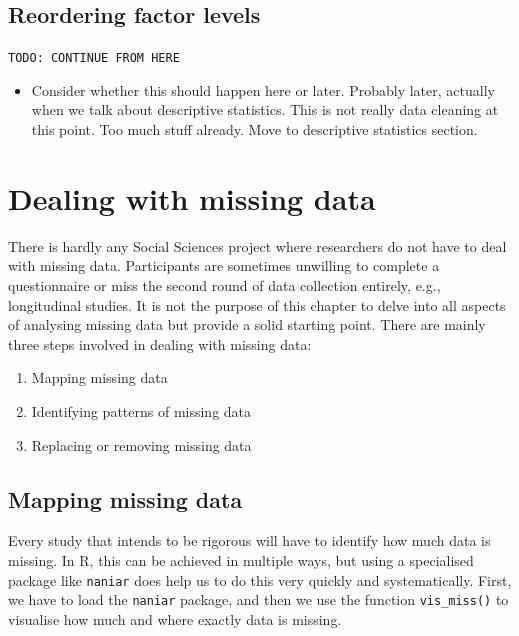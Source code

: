 \documentclass[
]{book}
\providecommand{\tightlist}{%
  \setlength{\itemsep}{0pt}\setlength{\parskip}{0pt}}
\begin{document}
\hypertarget{reordering-factor-levels}{%
\subsection{Reordering factor levels}\label{reordering-factor-levels}}

\texttt{TODO:\ CONTINUE\ FROM\ HERE}

\begin{itemize}
\tightlist
\item
  Consider whether this should happen here or later. Probably later, actually when we talk about descriptive statistics. This is not really data cleaning at this point. Too much stuff already. Move to descriptive statistics section.
\end{itemize}

\hypertarget{dealing-with-missing-data}{%
\section{Dealing with missing data}\label{dealing-with-missing-data}}

There is hardly any Social Sciences project where researchers do not have to deal with missing data. Participants are sometimes unwilling to complete a questionnaire or miss the second round of data collection entirely, e.g., longitudinal studies. It is not the purpose of this chapter to delve into all aspects of analysing missing data but provide a solid starting point. There are mainly three steps involved in dealing with missing data:

\begin{enumerate}
\def\labelenumi{\arabic{enumi}.}
\item
  Mapping missing data
\item
  Identifying patterns of missing data
\item
  Replacing or removing missing data
\end{enumerate}

\hypertarget{mapping-missing-data}{%
\subsection{Mapping missing data}\label{mapping-missing-data}}

Every study that intends to be rigorous will have to identify how much data is missing. In R, this can be achieved in multiple ways, but using a specialised package like \texttt{naniar} does help us to do this very quickly and systematically. First, we have to load the \texttt{naniar} package, and then we use the function \texttt{vis\_miss()} to visualise how much and where exactly data is missing.
\end{document}
